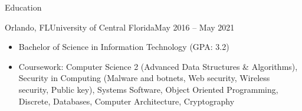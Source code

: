 \documentclass[calibri]{mcdowellcv}
\begin{document}
	\begin{cvsection}{Education}
		\begin{cvsubsection}{Orlando, FL}{University of Central Florida}{May 2016 -- May 2021}
			\begin{itemize}
				\item Bachelor of Science in Information Technology (GPA: 3.2)
				\item Coursework: Computer Science 2 (Advanced Data Structures \& Algorithms), Security in Computing (Malware and botnets, Web security, Wireless security, Public key), Systems Software, Object Oriented Programming, Discrete, Databases, Computer Architecture, Cryptography
			\end{itemize}
		\end{cvsubsection}
	\end{cvsection}
	
\end{document}
